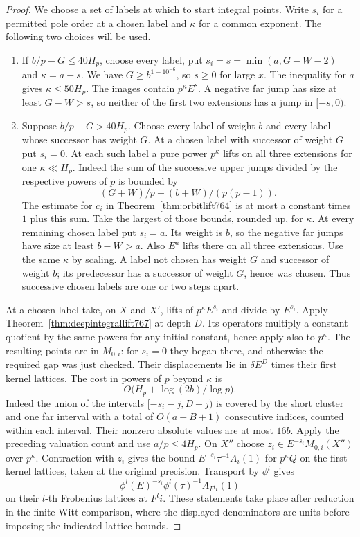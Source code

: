 \documentclass[a4paper,11pt]{article}
\theoremstyle{definition}
\theoremstyle{remark}
\numberwithin{equation}{section}
\begin{document}
\begin{proof}
We choose a set of labels at which to start integral
points. Write \(s_i\) for a permitted pole order at a
chosen label and \(\kappa\) for a common exponent. The
following two choices will be used.
\begin{enumerate}
\item If \(b/p-G\le40H_p\), choose every label, put
\(s_i=s=\min(a,G-W-2)\) and \(\kappa=a-s\). We have
\(G\ge b^{1-10^{-6}}\), so \(s\ge0\) for large \(x\).
The inequality for \(a\) gives \(\kappa\le50H_p\).
The images contain \(p^\kappa E^s\). A negative far
jump has size at least \(G-W>s\), so neither of the
first two extensions has a jump in \([-s,0)\).
\item Suppose \(b/p-G>40H_p\). Choose every label of
weight \(b\) and every label whose successor has weight
\(G\). At a chosen label with successor of weight \(G\)
put \(s_i=0\). At each such label a pure power \(p^\kappa\)
lifts on all three extensions for one \(\kappa\ll H_p\).
Indeed the sum of the successive upper jumps divided by
the respective powers of \(p\) is bounded by
\[
                 (G+W)/p+(b+W)/(p(p-1)).
\]
The estimate for \(c_i\) in Theorem~\ref{thm:orbitlift764}
is at most a constant times \(1\) plus this sum. Take
the largest of those bounds, rounded up, for \(\kappa\).
At every remaining chosen label put \(s_i=a\).
Its weight is \(b\), so the negative far jumps have
size at least \(b-W>a\). Also \(E^a\) lifts there on all
three extensions. Use the same \(\kappa\) by scaling.
A label not chosen has weight \(G\) and successor of
weight \(b\); its predecessor has a successor of weight
\(G\), hence was chosen. Thus successive chosen labels
are one or two steps apart.
\end{enumerate}

At a chosen label take, on \(X\) and \(X'\), lifts of
\(p^\kappa E^{s_i}\) and divide by \(E^{s_i}\).
Apply Theorem~\ref{thm:deepintegrallift767} at depth \(D\).
Its operators multiply a constant quotient by the same
powers for any initial constant, hence apply also to
\(p^\kappa\). The resulting points are in \(M_{0,i}\):
for \(s_i=0\) they began there, and otherwise the required
gap was just checked. Their displacements lie in
\(\delta E^D\) times their first kernel lattices. The cost
in powers of \(p\) beyond \(\kappa\) is
\[
                       O\big(H_p+\log(2b)/\log p\big).
\]
Indeed the union of the intervals \([-s_i-j,D-j)\) is
covered by the short cluster and one far interval with
a total of \(O(a+B+1)\) consecutive indices, counted
within each interval. Their nonzero absolute values are
at most \(16b\). Apply the preceding valuation count
and use \(a/p\le4H_p\). On \(X''\) choose
\(z_i\in E^{-s_i}M_{0,i}(X'')\) over \(p^\kappa\).
Contraction with \(z_i\) gives the bound
\(E^{-s_i}\tau^{-1}A_i(1)\) for \(p^\kappa Q\) on the
first kernel lattices, taken at the original precision.
Transport by \(\phi^l\) gives
\[
        \phi^l(E)^{-s_i}\phi^l(\tau)^{-1}A_{F^li}(1)
\]
on their \(l\)-th Frobenius lattices at \(F^li\).
These statements take place after reduction in the
finite Witt comparison, where the displayed denominators
are units before imposing the indicated lattice bounds.


\end{proof}
\end{document}
